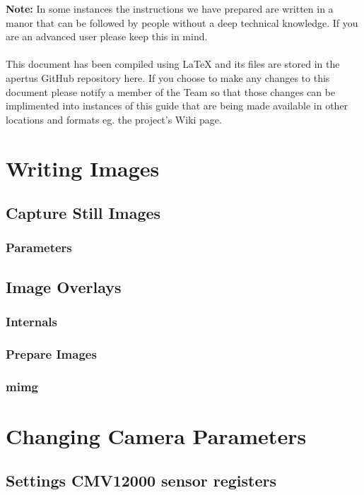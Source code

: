 \documentclass{article}
\begin{document}
\tableofcontents

\vspace*{\fill}
\textbf{Note:} In some instances the instructions we have prepared are written in a manor that can be followed by people without a deep technical knowledge. If you are an advanced user please keep this in mind.\\
\\This document has been compiled using LaTeX and its files are stored in the apertus GitHub repository here. If you choose to make any changes to this document please notify a member of the Team so that those changes can be implimented into instances of this guide that are being made available in other locations and formats eg. the project's Wiki page.

\newpage







\section{Writing Images}
\subsection{Capture Still Images}
\subsubsection{Parameters}
\subsection{Image Overlays}
\subsubsection{Internals}
\subsubsection{Prepare Images}
\subsubsection{mimg}

\section{Changing Camera Parameters}
\subsection{Settings CMV12000 sensor registers}
\end{document}
